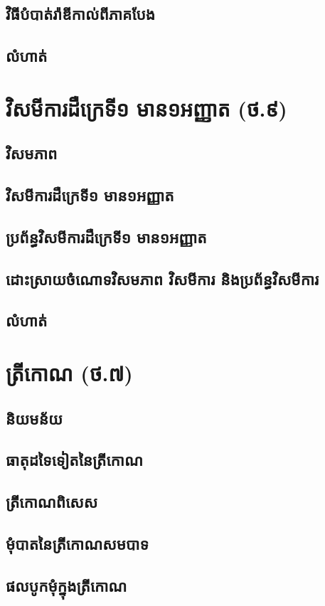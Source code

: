 \documentclass[a4paper,12pt,blue]{pptec}
\begin{document}
	\section{វិធីបំបាត់រ៉ាឌីកាល់ពីភាគបែង}
	\section{លំហាត់}
	\chapter{វិសមីការដឺក្រេទី១ មាន១អញ្ញាត (ថ.៩)}
	\section{វិសមភាព}
	\section{វិសមីការដឺក្រេទី១ មាន១អញ្ញាត}
	\section{ប្រព័ន្ធវិសមីការដឺក្រេទី១ មាន១អញ្ញាត}
	\section{ដោះស្រាយចំណោទវិសមភាព វិសមីការ និងប្រព័ន្ធវិសមីការ}
	\section{លំហាត់}
	\chapter{ត្រីកោណ (ថ.៧)}
	\section{និយមន័យ}
	\section{ធាតុដទៃទៀតនៃត្រីកោណ}
	\section{ត្រីកោណពិសេស}
	\section{មុំបាតនៃត្រីកោណសមបាទ}
	\section{ផលបូកមុំក្នុងត្រីកោណ}
\end{document}
